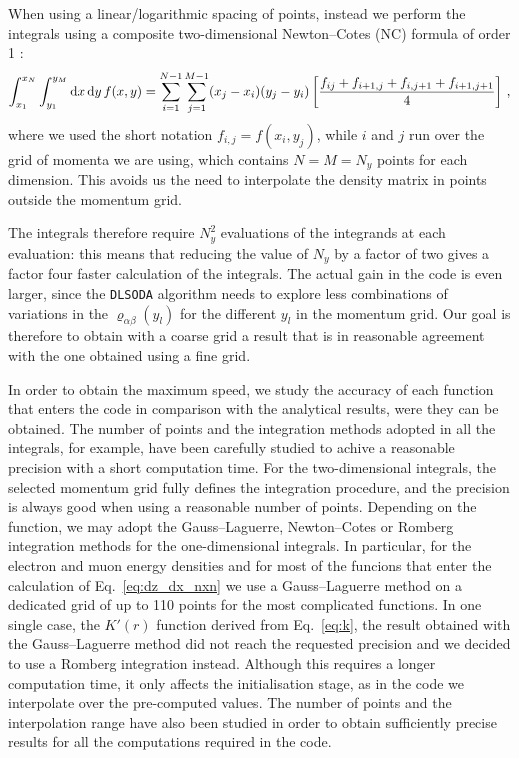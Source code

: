 \documentclass[notitlepage,showpacs,preprintnumbers,amsmath,amssymb,superscriptaddress,prd,onecolumn]{revtex4-1}
\begin{document}
When using a linear/logarithmic spacing of points, instead
we perform the integrals using a composite two-dimensional Newton--Cotes (NC) formula of order 1 \cite{newtoncotes}:
\begin{equation}
\int_{x_1}^{x_N}\int_{y_1}^{y_M}{\rm d}x\, {\rm d}y\, f(x, y)
=
\sum_{i=1}^{N-1}\sum_{j=1}^{M-1}
(x_j-x_i)(y_j-y_i)
\left[\frac{f_{ij} + f_{i+1,j} + f_{i,j+1} + f_{i+1,j+1}}{4}\right]\,,
\end{equation}
where we used the short notation $f_{i,j} = f(x_i,y_j)$,
while $i$ and $j$ run over the grid of momenta we are using,
which contains $N=M=N_y$ points for each dimension.
This avoids us the need to interpolate the density matrix in points outside the momentum grid.

The integrals therefore require $N_y^2$ evaluations of the integrands at each evaluation:
this means that reducing the value of $N_y$ by a factor of two
gives a factor four faster calculation of the integrals.
The actual gain in the code is even larger, since the \texttt{DLSODA} algorithm needs to explore less combinations
of variations in the $\varrho_{\alpha\beta}(y_l)$ for the different $y_l$ in the momentum grid.
Our goal is therefore to obtain with a coarse grid
a result that is in reasonable agreement with the one obtained using a fine grid.

In order to obtain the maximum speed,
we study the accuracy of each function that enters the code in comparison
with the analytical results, were they can be obtained.
The number of points and the integration methods adopted in all the integrals,
for example, have been carefully studied to achive a reasonable precision
with a short computation time.
For the two-dimensional integrals, the selected momentum grid
fully defines the integration procedure, and the precision is always good
when using a reasonable number of points.
Depending on the function, we may adopt the Gauss--Laguerre, Newton--Cotes or Romberg integration \cite{Romberg:1955}
methods for the one-dimensional integrals.
In particular, for the electron and muon energy densities
and for most of the funcions that enter the calculation of Eq.~\eqref{eq:dz_dx_nxn}
we use a Gauss--Laguerre method on a dedicated grid of up to 110 points
for the most complicated functions.
In one single case, the $K'(r)$ function derived from Eq.~\eqref{eq:k},
the result obtained with the Gauss--Laguerre method
did not reach the requested precision and we decided to use a Romberg integration instead.
Although this requires a longer computation time, it only affects the initialisation stage,
as in the code we interpolate over the pre-computed values.
The number of points and the interpolation range have also been studied in order to obtain sufficiently precise results
for all the computations required in the code.
\end{document}
